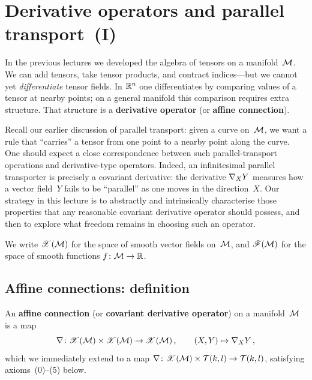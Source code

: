 
\section{Derivative operators and parallel transport~(I)}%
\label{sec:derivative-operators}

In the previous lectures we developed the algebra of tensors on a
manifold~$\mathcal{M}$.  We can add tensors, take tensor products, and
contract indices---but we cannot yet \emph{differentiate} tensor
fields.  In $\mathbb{R}^{n}$ one differentiates by comparing values of a
tensor at nearby points; on a general manifold this comparison
requires extra structure.  That structure is a \textbf{derivative
operator} (or \textbf{affine connection}).

Recall our earlier discussion of parallel transport: given a curve
on~$\mathcal{M}$, we want a rule that ``carries'' a tensor from one point
to a nearby point along the curve.  One should expect a close
correspondence between such parallel-transport operations and
derivative-type operators.  Indeed, an infinitesimal parallel
transporter is precisely a covariant derivative: the derivative
$\nabla_X Y$ measures how a vector field~$Y$ fails to be
``parallel'' as one moves in the direction~$X$.  Our strategy in
this lecture is to abstractly and intrinsically characterise those
properties that any reasonable covariant derivative operator
should possess, and then to explore what freedom remains in
choosing such an operator.

\begin{notation}
  We write $\mathscr{X}(\mathcal{M})$ for the space of smooth vector
  fields on~$\mathcal{M}$, and $\mathscr{F}(\mathcal{M})$ for the space of smooth
  functions $f\colon\mathcal{M}\to\mathbb{R}$.
\end{notation}

\subsection{Affine connections: definition}\label{sec:affine-connection}

\begin{definition}%
\label{def:affine-connection}
  An \textbf{affine connection} (or \textbf{covariant derivative
  operator}) on a manifold~$\mathcal{M}$ is a map
  \[
    \nabla\colon \mathscr{X}(\mathcal{M})\times\mathscr{X}(\mathcal{M})
      \to \mathscr{X}(\mathcal{M})\,,
    \qquad (X,Y)\mapsto \nabla_X Y\,,
  \]
  which we immediately extend to a map
  $\nabla\colon \mathscr{X}(\mathcal{M})\times\mathcal{T}(k,l)
  \to\mathcal{T}(k,l)$, satisfying axioms~(0)--(5) below.
\end{definition}

